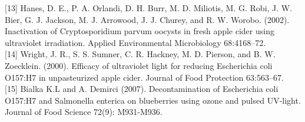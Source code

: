 \documentclass[journal]{IEEEtran}
\begin{document}
[13] Hanes, D. E., P. A. Orlandi, D. H. Burr, M. D. Miliotis, M. G.
Robi, J. W. Bier, G. J. Jackson, M. J. Arrowood, J. J. Churey,
and R. W. Worobo. (2002). Inactivation of Cryptosporidium
parvum oocysts in fresh apple cider using ultraviolet irradiation. Applied Environmental Microbiology 68:4168–72.\\[0.001in]

[14] Wright, J. R., S. S. Sumner, C. R. Hackney, M. D. Pierson,
and B. W. Zoecklein. (2000). Efficacy of ultraviolet light for
reducing Escherichia coli O157:H7 in unpasteurized apple
cider. Journal of Food Protection 63:563–67. \\[0.001in]

[15] Bialka K.L and A. Demirci (2007). Decontamination of
Escherichia coli O157:H7 and Salmonella enterica on blueberries using ozone and pulsed UV-light. Journal of Food
Science 72(9): M931-M936.\\[0.001in]
\end{document}
